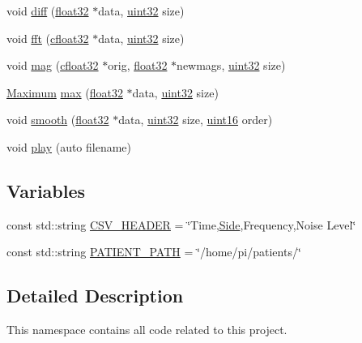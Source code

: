 \begin{DoxyCompactItemize}
void \hyperlink{namespacevaso_a7d108bce812e906d8b1810815774c7ea}{diff} (\hyperlink{definitions_8hpp_aacdc525d6f7bddb3ae95d5c311bd06a1}{float32} $\ast$data, \hyperlink{definitions_8hpp_a1134b580f8da4de94ca6b1de4d37975e}{uint32} size)
\item 
void \hyperlink{namespacevaso_af74f08a8afd7967b6c2b3c2b0e5fb1e9}{fft} (\hyperlink{definitions_8hpp_a960be6b6614c08090c16574dba10a421}{cfloat32} $\ast$data, \hyperlink{definitions_8hpp_a1134b580f8da4de94ca6b1de4d37975e}{uint32} size)
\item 
void \hyperlink{namespacevaso_a5d355b5c326a852e2ce95c258450898c}{mag} (\hyperlink{definitions_8hpp_a960be6b6614c08090c16574dba10a421}{cfloat32} $\ast$orig, \hyperlink{definitions_8hpp_aacdc525d6f7bddb3ae95d5c311bd06a1}{float32} $\ast$newmags, \hyperlink{definitions_8hpp_a1134b580f8da4de94ca6b1de4d37975e}{uint32} size)
\item 
\hyperlink{structMaximum}{Maximum} \hyperlink{namespacevaso_a122846d728be312454a452d379915e10}{max} (\hyperlink{definitions_8hpp_aacdc525d6f7bddb3ae95d5c311bd06a1}{float32} $\ast$data, \hyperlink{definitions_8hpp_a1134b580f8da4de94ca6b1de4d37975e}{uint32} size)
\item 
void \hyperlink{namespacevaso_a5b7fc1a58199e2cac989f417a9faa1ce}{smooth} (\hyperlink{definitions_8hpp_aacdc525d6f7bddb3ae95d5c311bd06a1}{float32} $\ast$data, \hyperlink{definitions_8hpp_a1134b580f8da4de94ca6b1de4d37975e}{uint32} size, \hyperlink{definitions_8hpp_a05f6b0ae8f6a6e135b0e290c25fe0e4e}{uint16} order)
\item 
void \hyperlink{namespacevaso_a7da499b9b1b5a492bea8ab8681e57c22}{play} (auto filename)
\end{DoxyCompactItemize}
\subsection*{Variables}
\begin{DoxyCompactItemize}
\item 
const std\+::string \hyperlink{namespacevaso_ade7cbcaad3dc577b643b3eea4b4e8aa0}{C\+S\+V\+\_\+\+H\+E\+A\+D\+E\+R} = \char`\"{}Time,\hyperlink{namespacevaso_a77c5d9704657d49d456f691ddd8abf7c}{Side},Frequency,Noise Level\char`\"{}
\item 
const std\+::string \hyperlink{namespacevaso_a0f49c8240a13e7d853912ad78d5f53c9}{P\+A\+T\+I\+E\+N\+T\+\_\+\+P\+A\+T\+H} = \char`\"{}/home/pi/patients/\char`\"{}
\end{DoxyCompactItemize}


\subsection{Detailed Description}
This namespace contains all code related to this project. 

